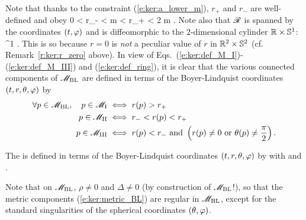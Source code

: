 Note that thanks to the constraint (\ref{e:ker:a_lower_m}), $r_+$ and $r_-$
are well-defined and obey
\be \label{e:ker:order_r_pm}
    0 < r_- < m < r_+ < 2 m .
\ee
Note also that $\mathscr{R}$ is spanned by the coordinates $(t,\varphi)$ and is diffeomorphic to the 2-dimensional cylinder $\mathbb{R}\times\mathbb{S}^1$:
\be \label{e:ker:ring_R_S1}
    \ring \simeq \R\times\SS^1 .
\ee
This is so because $r=0$ is \emph{not} a peculiar value of $r$ in $\mathbb{R}^2\times\mathbb{S}^2$
(cf. Remark~\ref{r:ker:r_zero} above).
In view of Eqs.~(\ref{e:ker:def_M_I})-(\ref{e:ker:def_M_III}) and (\ref{e:ker:def_ring}), it is clear that
the various connected components of $\mathscr{M}_{\rm BL}$ are defined in terms of
the Boyer-Lindquist coordinates $(t,r,\theta,\varphi)$ by
\begin{subequations}
\label{e:ker:M_I_III_r}
\begin{align}
  \forall p \in  \mathscr{M}_{\rm BL},\quad p \in \mathscr{M}_{\rm I} & \iff r(p) > r_+ \\
    \quad p \in \mathscr{M}_{\rm II} & \iff r_- < r(p) < r_+ \\
    \quad p \in \mathscr{M}_{\rm III} & \iff r(p) < r_-\ \mbox{and}\
    \left( r(p) \not=0 \ \mbox{or}\ \theta(p) \not=\frac{\pi}{2} \right) .
\end{align}
\end{subequations}

\begin{greybox}
The  is defined
in terms of the Boyer-Lindquist coordinates $(t,r,\theta,\varphi)$
by
\be \label{e:ker:metric_BL}
\ee
with
\be \label{e:ker:def_rho2}
\ee
and
\be \label{e:ker:def_Delta}
     .
\ee
\end{greybox}

Note that on $\mathscr{M}_{\rm BL}$, $\rho\not=0$ and $\Delta\not=0$ (by construction
of $\mathscr{M}_{\rm BL}$!), so that the metric components (\ref{e:ker:metric_BL})
are regular in $\mathscr{M}_{\rm BL}$, except for the standard singularities of
the spherical coordinates $(\theta,\varphi)$.

